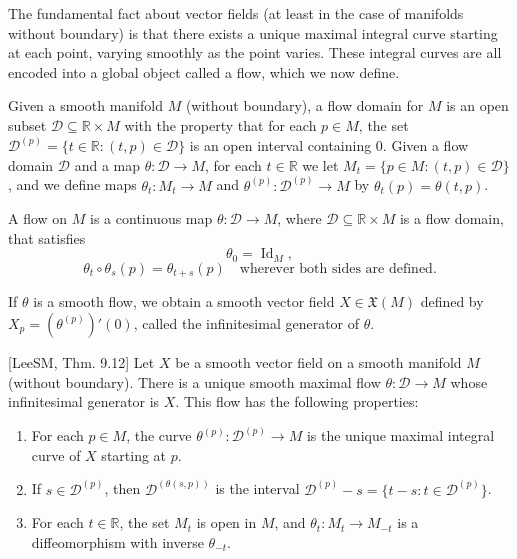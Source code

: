 The fundamental fact about vector fields (at least in the case of manifolds without boundary) is that there exists a unique maximal integral curve starting at each point, varying smoothly as the point varies. These integral curves are all encoded into a
global object called a flow, which we now define.

Given a smooth manifold $M$ (without boundary), a flow domain for $M$ is an
open subset $\mathcal{D} \subseteq \mathbb{R} \times M$ with the property that for each $p \in M$, the set $\mathcal{D}^{(p)} =
\{t \in \mathbb{R} : (t, p) \in \mathcal{D}\}$ is an open interval containing 0. Given a flow domain $\mathcal{D}$ and a
map $\theta: \mathcal{D} \to M$, for each $t \in \mathbb{R}$ we let $M_t = \{p \in M : (t, p) \in \mathcal{D}\}$, and we define
maps $\theta_t: M_t \to M$ and $\theta^{(p)}: \mathcal{D}^{(p)} \to M$ by $\theta_t(p) = \theta(t, p)$.

A flow on $M$ is a continuous map $\theta: \mathcal{D} \to M$, where $\mathcal{D} \subseteq \mathbb{R} \times M$ is a flow
domain, that satisfies
\[
\theta_0 = \operatorname{Id}_M,
\]
\[
\theta_t \circ \theta_s(p) = \theta_{t+s}(p) \quad \text{wherever both sides are defined}.
\]

If $\theta$ is a smooth flow, we obtain a smooth vector field $X \in \mathfrak{X}(M)$ defined by $X_p =
(\theta^{(p)})' (0)$, called the infinitesimal generator of $\theta$.

\begin{theorem}
\label{thm:fundamental-theorem-on-flows}
[LeeSM, Thm. 9.12] Let $X$ be a smooth vector field on a smooth manifold $M$ (without boundary). There is a
unique smooth maximal flow $\theta: \mathcal{D} \to M$ whose infinitesimal generator is $X$. This
flow has the following properties:
\begin{enumerate}[label=(\alph*)]
\item For each $p \in M$, the curve $\theta^{(p)}: \mathcal{D}^{(p)} \to M$ is the unique maximal integral
curve of $X$ starting at $p$.
\item If $s \in \mathcal{D}^{(p)}$, then $\mathcal{D}^{(\theta(s,p))}$ is the interval $\mathcal{D}^{(p)} - s = \{t - s : t \in \mathcal{D}^{(p)}\}$.
\item For each $t \in \mathbb{R}$, the set $M_t$ is open in $M$, and $\theta_t: M_t \to M_{-t}$ is a diffeomorphism with inverse $\theta_{-t}$.
\end{enumerate}
\end{theorem}

